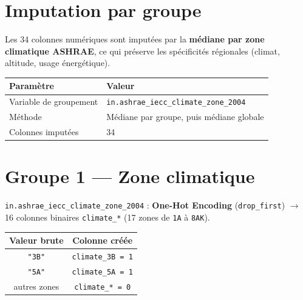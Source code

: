 \documentclass[11pt,a4paper]{article}
\begin{document}
\section{Imputation par groupe}

Les 34 colonnes numériques sont imputées par la \textbf{médiane par zone
climatique ASHRAE}, ce qui préserve les spécificités régionales
(climat, altitude, usage énergétique).

\begin{center}
\begin{tabular}{ll}
\toprule
\textbf{Paramètre} & \textbf{Valeur} \\
\midrule
\rowcolor{rowgray} Variable de groupement
  & \texttt{in.ashrae\_iecc\_climate\_zone\_2004} \\
Méthode & Médiane par groupe, puis médiane globale \\
\rowcolor{rowgray} Colonnes imputées & 34 \\
\bottomrule
\end{tabular}
\end{center}

\section{Groupe 1 — Zone climatique}

\texttt{in.ashrae\_iecc\_climate\_zone\_2004} : \textbf{One-Hot Encoding}
(\texttt{drop\_first}) $\to$ 16 colonnes binaires \texttt{climate\_*}
(17 zones de \texttt{1A} à \texttt{8AK}).

\begin{center}
\begin{tabular}{cc}
\toprule
\textbf{Valeur brute} & \textbf{Colonne créée} \\
\midrule
\rowcolor{rowgray} \texttt{"3B"} & \texttt{climate\_3B = 1} \\
\texttt{"5A"} & \texttt{climate\_5A = 1} \\
\rowcolor{rowgray} autres zones & \texttt{climate\_* = 0} \\
\bottomrule
\end{tabular}
\end{center}

\end{document}
